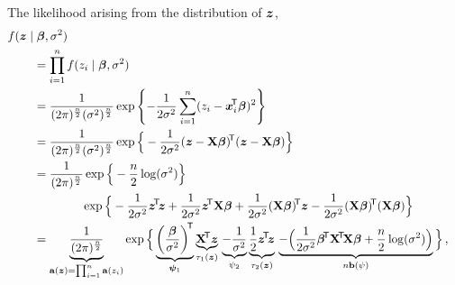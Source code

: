 

The likelihood arising from the distribution of ${\bm z}$,
\begin{align*}
\lefteqn{f(\z \mid \bbeta, \sigma^2)}\hspace{5ex}\\
               &= \prod_{i=1}^n f(z_i \mid \bbeta, \sigma^2)\\
               &= \frac{1}{(2\pi)^{\frac{n}{2}} (\sigma^2)^{\frac{n}{2}}}
                  \exp\left\{ -\frac{1}{2 \sigma^2} \sum_{i=1}^n (z_i - \x_i^\tra\bbeta)^2  \right\}\\
               &= \frac{1}{(2\pi)^{\frac{n}{2}} (\sigma^2)^{\frac{n}{2}}}
                  \exp \Big\{ -\frac{1}{2 \sigma^2} (\z -\X\bbeta)^\tra (\z -\X\bbeta) \Big\}\\
               &= \frac{1}{(2\pi)^{\frac{n}{2}}}
                  \exp \Big\{ -\frac{n}{2}\log(\sigma^2) \Big\} \\ 
               & \hspace*{9.4ex}%
                  \exp \Big\{ -\frac{1}{2 \sigma^2} \ztz
                              +\frac{1}{2 \sigma^2} \z^\tra \X\bbeta
                              +\frac{1}{2 \sigma^2} (\X\bbeta)^\tra \z
                              -\frac{1}{2 \sigma^2} (\X\bbeta)^\tra (\X\bbeta) \Big\}\\
               &= \underbrace{ \frac{1}{(2\pi)^{\frac{n}{2}}} }_{ \mbf{a}(\bs{z}) = \prod_{i=1}^n \mbf{a}(z_i)}
                  \exp \Big\{ \underbrace{ \left(\frac{\bbeta}{\sigma^2}\right)^\tra}_{\bpsi_1}
                              \underbrace{ \X^\tra \z }_{ \tau_1(\z) } \,
                              \underbrace{-\frac{1}{\sigma^2}}_{\psi_2}
                              \underbrace{ \frac{1}{2} \ztz }_{\tau_2(\z)} \,
                              \underbrace{-\Big(\frac{1}{2 \sigma^2} \bbeta^\tra \XtX \bbeta
                                          +\frac{n}{2} \log(\sigma^2) \Big)}_{n \mbf{b}(\psi)} \Big\}\,,
\end{align*}


